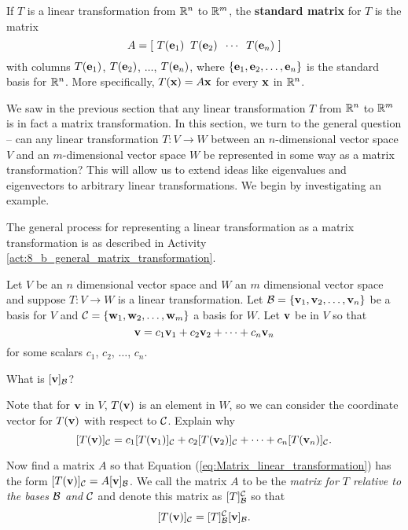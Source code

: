 \begin{definition} If $T$ is a linear transformation from $\mathbb{R}^n$ to $\mathbb{R}^m$, the \textbf{standard matrix} for $T$ is the matrix  
\[A= [ \ T(\mathbf{e}_1) \;\;  T(\mathbf{e}_2)  \;\; \cdots \;\;  T(\mathbf{e}_n) \ ]\]
with columns $T(\mathbf{e}_1)$, $T(\mathbf{e}_2)$, $\ldots$, $T(\mathbf{e}_n)$, where $\{\mathbf{e}_1, \mathbf{e}_2, \ldots, \mathbf{e}_n\}$ is the standard basis for $\mathbb{R}^n$. More specifically, $T(\mathbf{x})=A\mathbf{x}$ for every $\mathbf{x}$ in $\mathbb{R}^n$. 
 \end{definition}



We saw in the previous section that any linear transformation $T$ from $\mathbb{R}^n$ to $\mathbb{R}^m$ is in fact a matrix transformation. In this section, we turn to the general question -- can any linear transformation $T: V \to W$ between an $n$-dimensional vector space $V$ and an $m$-dimensional vector space $W$ be represented in some way as a matrix transformation? This will allow us to extend ideas like eigenvalues and eigenvectors to arbitrary linear transformations. We begin by investigating an example.



The general process for representing a linear transformation as a matrix transformation is as described in Activity \ref{act:8_b_general_matrix_transformation}. 


\begin{activity} \label{act:8_b_general_matrix_transformation} Let $V$ be an $n$ dimensional vector space and $W$ an $m$ dimensional vector space and suppose $T : V \to W$ is a linear transformation. Let $\mathcal{B} = \{\mathbf{v}_1, \mathbf{v}_2, \ldots, \mathbf{v}_n\}$ be a basis for $V$ and $\mathcal{C} = \{\mathbf{w}_1, \mathbf{w}_2, \ldots, \mathbf{w}_m\}$ a basis for $W$. Let $\mathbf{v}$ be in $V$ so that 
\[\mathbf{v} = c_1\mathbf{v}_1 + c_2 \mathbf{v}_2 + \cdots + c_n \mathbf{v}_n\]
for some scalars $c_1$, $c_2$, $\ldots$, $c_n$. 
	\ba
	\item What is $[\mathbf{v}]_{\mathcal{B}}$?
	
	\item Note that for $\mathbf{v}$ in $V$, $T(\mathbf{v})$ is an element in $W$, so we can consider the coordinate vector for $T(\mathbf{v})$ with respect to $\mathcal{C}$. Explain why 
\begin{equation} \label{eq:Matrix_linear_transformation}
[T(\mathbf{v})]_{\mathcal{C}} = c_1[T(\mathbf{v}_1)]_{\mathcal{C}} + c_2 [T(\mathbf{v}_2)]_{\mathcal{C}} + \cdots + c_n [T(\mathbf{v}_n)]_{\mathcal{C}}.
\end{equation}


	\item Now find a matrix $A$ so that Equation (\ref{eq:Matrix_linear_transformation}) has the form $[T(\mathbf{v})]_{\mathcal{C}} = A [\mathbf{v}]_{\mathcal{B}}$. We call the matrix $A$ to be the \emph{matrix for $T$ relative to the bases $\mathcal{B}$ and $\mathcal{C}$} and denote this matrix as $[T]_{\mathcal{B}}^{\mathcal{C}}$ so that
\[[T(\mathbf{v})]_{\mathcal{C}} = [T]_{\mathcal{B}}^{\mathcal{C}} [\mathbf{v}]_{\mathcal{B}}.\]

	\ea

\end{activity}


